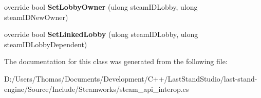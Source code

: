 \begin{DoxyCompactItemize}
\item 
\hypertarget{classValve_1_1Steamworks_1_1CSteamMatchmaking_a84a77c1e5d87884a233999aad245ace8}{}override bool {\bfseries Set\+Lobby\+Owner} (ulong steam\+I\+D\+Lobby, ulong steam\+I\+D\+New\+Owner)\label{classValve_1_1Steamworks_1_1CSteamMatchmaking_a84a77c1e5d87884a233999aad245ace8}

\item 
\hypertarget{classValve_1_1Steamworks_1_1CSteamMatchmaking_a7281b21d17288a03d3f694b7e96bc745}{}override bool {\bfseries Set\+Linked\+Lobby} (ulong steam\+I\+D\+Lobby, ulong steam\+I\+D\+Lobby\+Dependent)\label{classValve_1_1Steamworks_1_1CSteamMatchmaking_a7281b21d17288a03d3f694b7e96bc745}

\end{DoxyCompactItemize}


The documentation for this class was generated from the following file\+:\begin{DoxyCompactItemize}
\item 
D\+:/\+Users/\+Thomas/\+Documents/\+Development/\+C++/\+Last\+Stand\+Studio/last-\/stand-\/engine/\+Source/\+Include/\+Steamworks/steam\+\_\+api\+\_\+interop.\+cs\end{DoxyCompactItemize}
